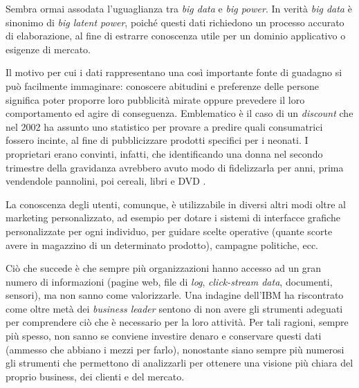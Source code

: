 Sembra ormai assodata l’uguaglianza tra \textit{big data} e \textit{big power}. In verità \textit{big data} è sinonimo di \textit{big latent power}, poiché questi dati richiedono un processo accurato di elaborazione,
al fine di estrarre conoscenza utile per un dominio applicativo o esigenze di mercato.

Il motivo per cui i dati rappresentano una così importante fonte di guadagno si può facilmente immaginare: conoscere abitudini e preferenze delle persone significa poter proporre 
loro pubblicità mirate oppure prevedere il loro comportamento ed agire di conseguenza. Emblematico è il caso di un \textit{discount} che nel 2002 ha assunto uno statistico per provare a 
predire quali consumatrici fossero incinte, al fine di pubblicizzare prodotti specifici per i neonati. I proprietari erano convinti, infatti, che identificando una donna nel secondo 
trimestre della gravidanza avrebbero avuto modo di fidelizzarla per anni, prima vendendole pannolini, poi cereali, libri e DVD \cite{URL:fidelity}.

La conoscenza degli utenti, comunque, è utilizzabile in diversi altri modi oltre al marketing personalizzato, ad esempio per dotare i sistemi di interfacce grafiche personalizzate 
per ogni individuo, per guidare scelte operative (quante scorte avere in magazzino di un determinato prodotto), campagne politiche, ecc.

Ciò che succede è che sempre più organizzazioni hanno accesso ad un gran numero di informazioni (pagine web, file di \textit{log}, \textit{click-stream data}, documenti, sensori), ma non sanno come
valorizzarle. Una indagine dell’IBM \cite{ibm:def1} ha riscontrato come oltre metà dei \textit{business leader} sentono di non avere gli strumenti adeguati per comprendere ciò che è necessario 
per la loro attività. Per tali ragioni, sempre più spesso, non sanno se conviene investire denaro e conservare questi dati (ammesso che abbiano i mezzi per farlo), nonostante siano
sempre più numerosi gli strumenti che permettono di analizzarli per ottenere una visione più chiara del proprio business, dei clienti e del mercato.

